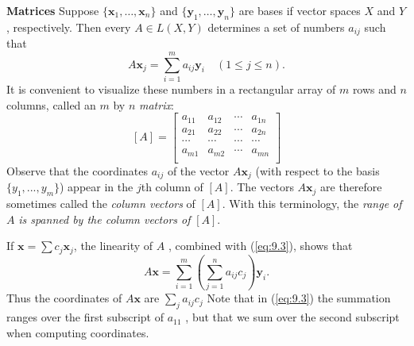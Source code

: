\begin{myDef}
    \textbf{Matrices} 
    Suppose $\{\mathbf{x}_1, \dots , \mathbf{x}_n\}$ 
    and $\{\mathbf{y}_1, \dots , \mathbf{y}_n\}$ are bases if vector spaces $X$ and $Y$, respectively.
    Then every $A \in L(X, Y)$ determines a set of numbers $a_{ij}$ such that 
    \begin{equation}
        \label{eq:9.3}
        A \mathbf{x}_j = 
        \sum_{i=1}^{m} a_{ij} \mathbf{y}_i
        \quad 
        (1 \leq j \leq n).
    \end{equation}
    It is convenient to visualize these numbers in a rectangular array of $m$ rows and $n$ columns, called an $m$ by $n$ \emph{matrix}:
    \begin{equation*}
        \left[ A \right] = 
        \begin{bmatrix}
            a_{11} & a_{12} & \cdots & a_{1n} \\
            a_{21} & a_{22} & \cdots & a_{2n} \\
            \cdots & \cdots & \cdots & \cdots \\
            a_{m1} & a_{m2} & \cdots & a_{mn} \\
        \end{bmatrix}
    \end{equation*}
    Observe that the coordinates $a_{ij}$ of the vector $A \mathbf{x}_j$ 
    (with respect to the basis $\{y_1, ... , y_m\}$) appear in the $j$th column of $[A]$. 
    The vectors $A \mathbf{x}_j$ are therefore sometimes called the \emph{column vectors} of $[A]$. 
    With this terminology, the \emph{range of} $A$ \emph{is spanned by the column vectors of} $[A]$.

    If $\mathbf{x} = \sum c_j \mathbf{x}_j$, the linearity of $A$ , combined with (\ref{eq:9.3}), shows that 
    \begin{equation}
        \label{eq:9.4}
        A \mathbf{x} = 
        \sum_{i=1}^{m} \left( 
            \sum_{j=1}^{n} a_{ij} c_j
         \right) 
         \mathbf{y}_i .
    \end{equation}
    Thus the coordinates of $A \mathbf{x}$ are $\sum_j a_{ij} c_j$ 
    Note that in (\ref{eq:9.3}) the summation ranges over the first subscript of $a_{11}$ , 
    but that we sum over the second subscript when computing coordinates.


\end{myDef}
